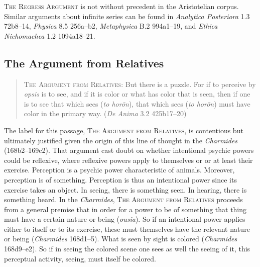 \textsc{The Regress Argument} is not without precedent in the Aristotelian corpus. Similar arguments about infinite series can be found in \emph{Analytica Posteriora} 1.3 72b8–14, \emph{Physica} 8.5 256a–b2, \emph{Metaphysica} B.2 994a1–19, and \emph{Ethica Nichomachea} 1.2 1094a18–21.


\subsection{The Argument from Relatives} %
\label{sub:the_argument_from_relatives}

\begin{quote}
	\textsc{The Argument from Relatives}: But there is a puzzle. For if to perceive by \emph{opsis} is to see, and if it is color or what has color that is seen, then if one is to see that which sees (\emph{to horōn}), that which sees (\emph{to horōn}) must have color in the primary way. (\emph{De Anima} 3.2 425b17–20)
\end{quote}

The label for this passage, \textsc{The Argument from Relatives}, is contentious but ultimately justified given the origin of this line of thought in the \emph{Charmides} (168b2–169c2). That argument cast doubt on whether intentional psychic powers could be reflexive, where reflexive powers apply to themselves or or at least their exercise. Perception is a psychic power characteristic of animals. Moreover, perception is of something. Perception is thus an intentional power since its exercise takes an object. In seeing, there is something seen. In hearing, there is something heard. In the \emph{Charmides}, \textsc{The Argument from Relatives} proceeds from a general premise that in order for a power to be of something that thing must have a certain nature or being (\emph{ousia}). So if an intentional power applies either to itself or to its exercise, these must themselves have the relevant nature or being (\emph{Charmides} 168d1–5). What is seen by sight is colored (\emph{Charmides} 168d9–e2). So if in seeing the colored scene one sees as well the seeing of it, this perceptual activity, seeing, must itself be colored.

